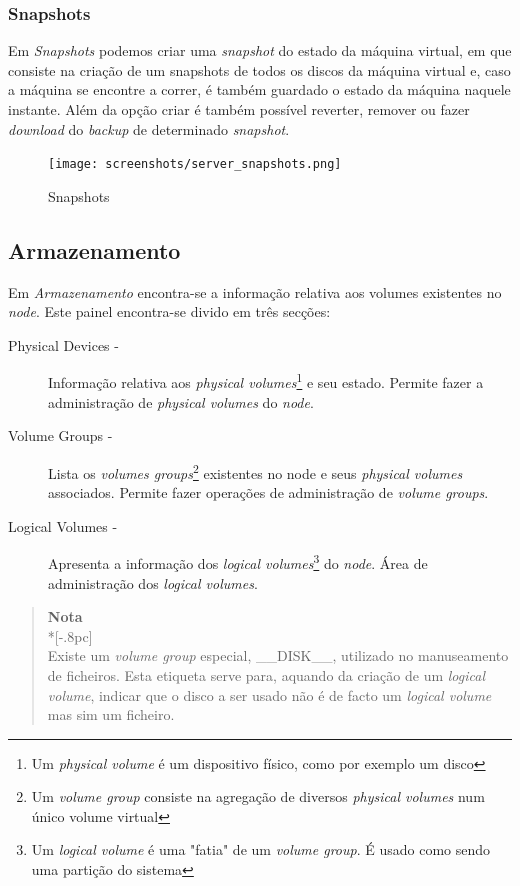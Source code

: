 \subsubsection{Snapshots}
\label{sec:server_snapshots}

Em \emph{Snapshots} podemos criar uma \emph{snapshot} do estado da máquina virtual, em que consiste na criação de um snapshots de todos os discos da máquina virtual e, caso a máquina se encontre a correr, é também guardado o estado da máquina naquele instante.
Além da opção criar é também possível reverter, remover ou fazer \emph{download} do \emph{backup} de determinado \emph{snapshot}.

\begin{figure}[H]
	\begin{center}
	\texttt{[image: screenshots/server\_snapshots.png]}
	\caption{Snapshots}
	\label{fig:server_snapshots}
	\end{center}
\end{figure}

\subsection{Armazenamento}
\label{sec:storage}

Em \emph{Armazenamento} encontra-se a informação relativa aos volumes existentes no \emph{node}.
Este painel encontra-se divido em três secções:

\begin{description}
	\item[Physical Devices -] Informação relativa aos \emph{physical volumes}\footnote{Um \emph{physical volume} é um dispositivo físico, como por exemplo um disco} e seu estado. Permite fazer a administração de \emph{physical volumes} do \emph{node}.
	\item[Volume Groups -] Lista os \emph{volumes groups}\footnote{Um \emph{volume group} consiste na agregação de diversos \emph{physical volumes} num único volume virtual} existentes no node e seus \emph{physical volumes} associados. Permite fazer operações de administração de \emph{volume groups}.
	\item[Logical Volumes -] Apresenta a informação dos \emph{logical volumes}\footnote{Um \emph{logical volume} é uma "fatia" de um \emph{volume group}. É usado como sendo uma partição do sistema} do \emph{node}. Área de administração dos \emph{logical volumes}.
\end{description}


\begin{quote}
	{\large \bf Nota} \\*[-.8pc]
	\underline{\hspace{6in}} \\
	Existe um \emph{volume group} especial, \_\_DISK\_\_, utilizado no manuseamento de ficheiros. Esta etiqueta serve para, aquando da criação de um \emph{logical volume}, indicar que o disco a ser usado não é de facto um \emph{logical volume} mas sim um ficheiro.
\end{quote}


